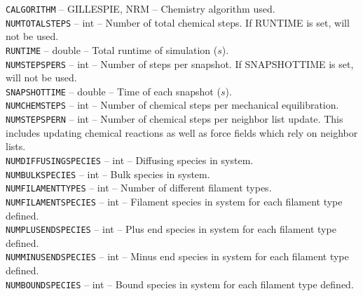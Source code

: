 \documentclass[11pt, oneside]{article}   	%
\begin{document}
     \noindent\texttt{CALGORITHM} -- GILLESPIE, NRM -- Chemistry algorithm used. \\
   
     \noindent\texttt{NUMTOTALSTEPS} -- int -- Number of total chemical steps. If RUNTIME is set, will not be used. \\
   
     \noindent\texttt{RUNTIME} -- double -- Total runtime of simulation ($s$). \\
   
     \noindent\texttt{NUMSTEPSPERS} -- int -- Number of steps per snapshot. If SNAPSHOTTIME is set, will not be used. \\
   
     \noindent\texttt{SNAPSHOTTIME} -- double -- Time of each snapshot ($s$). \\
   
     \noindent\texttt{NUMCHEMSTEPS} -- int -- Number of chemical steps per mechanical equilibration. \\
   
     \noindent\texttt{NUMSTEPSPERN} -- int -- Number of chemical steps per neighbor list update. This includes updating
   chemical reactions as well as force fields which rely on neighbor lists. \\
   
     \noindent\texttt{NUMDIFFUSINGSPECIES} -- int -- Diffusing species in system. \\
   
     \noindent\texttt{NUMBULKSPECIES} -- int -- Bulk species in system. \\
   
      \noindent\texttt{NUMFILAMENTTYPES} -- int -- Number of different filament types. \\
   
     \noindent\texttt{NUMFILAMENTSPECIES} -- int -- Filament species in system for each filament type defined. \\
   
     \noindent\texttt{NUMPLUSENDSPECIES} -- int -- Plus end species in system for each filament type defined. \\
   
     \noindent\texttt{NUMMINUSENDSPECIES} -- int -- Minus end species in system for each filament type defined. \\
   
     \noindent\texttt{NUMBOUNDSPECIES} -- int -- Bound species in system for each filament type defined. \\
   
\end{document}
